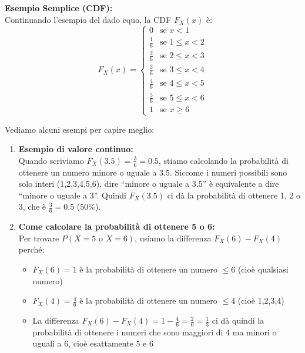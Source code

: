 \noindent\textbf{Esempio Semplice (CDF):} \\
Continuando l'esempio del dado equo, la CDF $F_X(x)$ è:
\[ F_X(x) = \begin{cases}
0 & \text{se } x < 1 \\
\frac{1}{6} & \text{se } 1 \le x < 2 \\
\frac{2}{6} & \text{se } 2 \le x < 3 \\
\frac{3}{6} & \text{se } 3 \le x < 4 \\
\frac{4}{6} & \text{se } 4 \le x < 5 \\
\frac{5}{6} & \text{se } 5 \le x < 6 \\
1 & \text{se } x \ge 6
\end{cases} \]

\noindent Vediamo alcuni esempi per capire meglio:

\begin{enumerate}
    \item \textbf{Esempio di valore continuo:} \\
    Quando scriviamo $F_X(3.5) = \frac{3}{6} = 0.5$, stiamo calcolando la probabilità di ottenere un numero minore o uguale a 3.5.
    Siccome i numeri possibili sono solo interi (1,2,3,4,5,6), dire ``minore o uguale a 3.5'' è equivalente a dire ``minore o uguale a 3''.
    Quindi $F_X(3.5)$ ci dà la probabilità di ottenere 1, 2 o 3, che è $\frac{3}{6} = 0.5$ (50\%).
    
    \item \textbf{Come calcolare la probabilità di ottenere 5 o 6:} \\
    Per trovare $P(X = 5 \text{ o } X = 6)$, usiamo la differenza $F_X(6) - F_X(4)$ perché:
    \begin{itemize}
        \item $F_X(6) = 1$ è la probabilità di ottenere un numero $\le 6$ (cioè qualsiasi numero)
        \item $F_X(4) = \frac{4}{6}$ è la probabilità di ottenere un numero $\le 4$ (cioè 1,2,3,4)
        \item La differenza $F_X(6) - F_X(4) = 1 - \frac{4}{6} = \frac{2}{6} = \frac{1}{3}$ ci dà quindi la probabilità di ottenere i numeri che sono maggiori di 4 ma minori o uguali a 6, cioè esattamente 5 e 6
    \end{itemize}
\end{enumerate}

